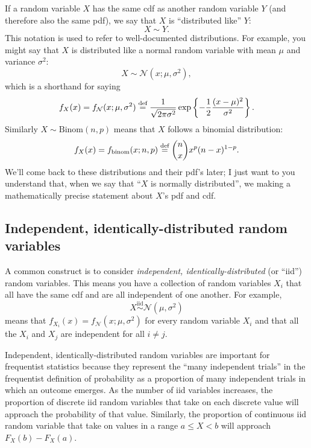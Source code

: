 If a random variable $X$ has the same cdf as another random variable $Y$ (and
therefore also the same pdf), we say that $X$ is ``distributed like'' $Y$:
$$
X \sim Y.
$$
This notation is used to refer to well-documented distributions. For example,
you might say that $X$ is distributed like a normal random variable with mean
$\mu$ and variance $\sigma^2$:
$$
X \sim \mathcal{N}(x; \mu, \sigma^2),
$$
which is a shorthand for saying
\begin{equation*}
f_X(x) = f_\mathcal{N}(x; \mu, \sigma^2) \stackrel{\text{def}}{=}
  \frac{1}{\sqrt{2\pi\sigma^2}} \exp \left\{-\frac{1}{2} \frac{(x-\mu)^2}{\sigma^2} \right\}.
\end{equation*}
Similarly $X \sim \mathrm{Binom}(n, p)$ means that $X$ follows a binomial distribution:
\begin{equation*}
f_X(x) = f_\mathrm{binom}(x; n, p) \stackrel{\text{def}}{=} \binom{n}{x} x^p (n-x)^{1-p}.
\end{equation*}
We'll come back to these distributions and their pdf's later; I just want to
you understand that, when we say that ``$X$ is normally distributed'', we
making a mathematically precise statement about $X$'s pdf and cdf.

\subsection{Independent, identically-distributed random variables}

A common construct is to consider \emph{independent, identically-distributed}
(or ``iid'') random variables. This means you have a collection of random variables $X_i$
that all have the same cdf and are all independent of one another. For example,
\begin{equation*}
X \stackrel{\text{iid}}{\sim} \mathcal{N}(\mu, \sigma^2)
\end{equation*}
means that $f_{X_i}(x) = f_\mathcal{N}(x; \mu, \sigma^2)$ for every random variable
$X_i$ and that all the $X_i$ and $X_j$ are independent for all $i \neq j$.

Independent, identically-distributed random variables are important for
frequentist statistics because they represent the ``many independent trials''
in the frequentist definition of probability as a proportion of many
independent trials in which an outcome emerges. As the number of iid variables
increases, the proportion of discrete iid random variables that take on each
discrete value will approach the probability of that value. Similarly, the
proportion of continuous iid random variable that take on values in a range $a
\leq X < b$ will approach $F_X(b) - F_X(a)$.

